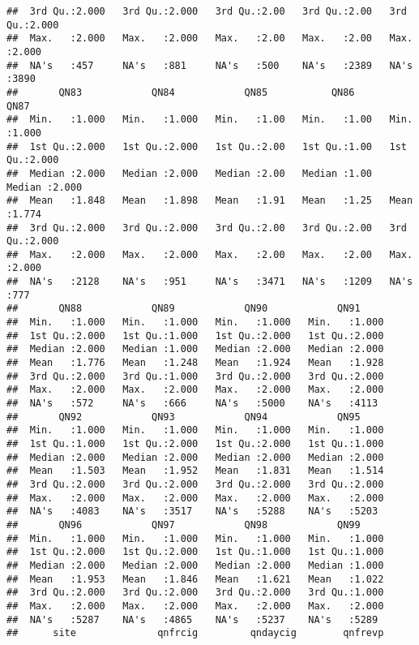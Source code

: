 \documentclass[
]{article}
\begin{document}
\begin{verbatim}
##  3rd Qu.:2.000   3rd Qu.:2.000   3rd Qu.:2.00   3rd Qu.:2.00   3rd Qu.:2.000  
##  Max.   :2.000   Max.   :2.000   Max.   :2.00   Max.   :2.00   Max.   :2.000  
##  NA's   :457     NA's   :881     NA's   :500    NA's   :2389   NA's   :3890   
##       QN83            QN84            QN85           QN86           QN87      
##  Min.   :1.000   Min.   :1.000   Min.   :1.00   Min.   :1.00   Min.   :1.000  
##  1st Qu.:2.000   1st Qu.:2.000   1st Qu.:2.00   1st Qu.:1.00   1st Qu.:2.000  
##  Median :2.000   Median :2.000   Median :2.00   Median :1.00   Median :2.000  
##  Mean   :1.848   Mean   :1.898   Mean   :1.91   Mean   :1.25   Mean   :1.774  
##  3rd Qu.:2.000   3rd Qu.:2.000   3rd Qu.:2.00   3rd Qu.:2.00   3rd Qu.:2.000  
##  Max.   :2.000   Max.   :2.000   Max.   :2.00   Max.   :2.00   Max.   :2.000  
##  NA's   :2128    NA's   :951     NA's   :3471   NA's   :1209   NA's   :777    
##       QN88            QN89            QN90            QN91      
##  Min.   :1.000   Min.   :1.000   Min.   :1.000   Min.   :1.000  
##  1st Qu.:2.000   1st Qu.:1.000   1st Qu.:2.000   1st Qu.:2.000  
##  Median :2.000   Median :1.000   Median :2.000   Median :2.000  
##  Mean   :1.776   Mean   :1.248   Mean   :1.924   Mean   :1.928  
##  3rd Qu.:2.000   3rd Qu.:1.000   3rd Qu.:2.000   3rd Qu.:2.000  
##  Max.   :2.000   Max.   :2.000   Max.   :2.000   Max.   :2.000  
##  NA's   :572     NA's   :666     NA's   :5000    NA's   :4113   
##       QN92            QN93            QN94            QN95      
##  Min.   :1.000   Min.   :1.000   Min.   :1.000   Min.   :1.000  
##  1st Qu.:1.000   1st Qu.:2.000   1st Qu.:2.000   1st Qu.:1.000  
##  Median :2.000   Median :2.000   Median :2.000   Median :2.000  
##  Mean   :1.503   Mean   :1.952   Mean   :1.831   Mean   :1.514  
##  3rd Qu.:2.000   3rd Qu.:2.000   3rd Qu.:2.000   3rd Qu.:2.000  
##  Max.   :2.000   Max.   :2.000   Max.   :2.000   Max.   :2.000  
##  NA's   :4083    NA's   :3517    NA's   :5288    NA's   :5203   
##       QN96            QN97            QN98            QN99      
##  Min.   :1.000   Min.   :1.000   Min.   :1.000   Min.   :1.000  
##  1st Qu.:2.000   1st Qu.:2.000   1st Qu.:1.000   1st Qu.:1.000  
##  Median :2.000   Median :2.000   Median :2.000   Median :1.000  
##  Mean   :1.953   Mean   :1.846   Mean   :1.621   Mean   :1.022  
##  3rd Qu.:2.000   3rd Qu.:2.000   3rd Qu.:2.000   3rd Qu.:1.000  
##  Max.   :2.000   Max.   :2.000   Max.   :2.000   Max.   :2.000  
##  NA's   :5287    NA's   :4865    NA's   :5237    NA's   :5289   
##      site              qnfrcig         qndaycig        qnfrevp     

\end{verbatim}
\end{document}
